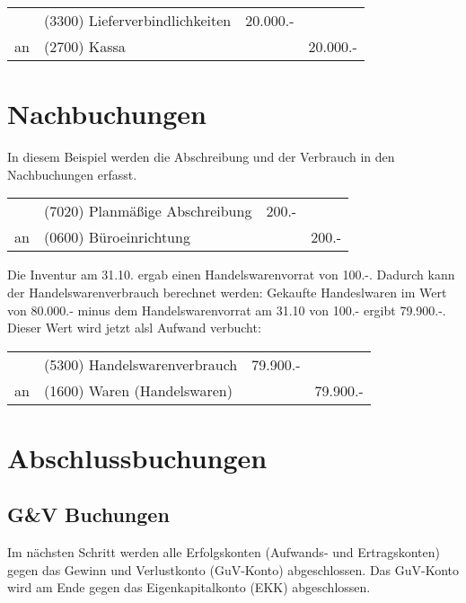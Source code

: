 \documentclass[parskip=half,12pt,a4paper]{scrartcl}
\begin{document}
\begin{center}
\begin{tabularx}{\textwidth}{rXrr}
 \toprule
    & (3300) Lieferverbindlichkeiten & 20.000.- &\\
 an & (2700) Kassa & & 20.000.-\\
\bottomrule
\end{tabularx}
\end{center}

\section{Nachbuchungen}

In diesem Beispiel werden die Abschreibung und der Verbrauch in den Nachbuchungen erfasst.

\begin{center}
\begin{tabularx}{\textwidth}{rXrr}
 \toprule
    & (7020) Planmäßige Abschreibung & 200.- &\\
 an & (0600) Büroeinrichtung & & 200.-\\
\bottomrule
\end{tabularx}
\end{center}

Die Inventur am 31.10. ergab einen Handelswarenvorrat von 100.-. Dadurch kann der Handelswarenverbrauch berechnet werden: Gekaufte Handeslwaren im Wert von 80.000.- minus dem Handelswarenvorrat am 31.10 von 100.- ergibt 79.900.-. Dieser Wert wird jetzt alsl Aufwand verbucht:

\begin{center}
\begin{tabularx}{\textwidth}{rXrr}
 \toprule
    & (5300) Handelswarenverbrauch & 79.900.- &\\
 an & (1600) Waren (Handelswaren) & & 79.900.-\\
\bottomrule
\end{tabularx}
\end{center}

\section{Abschlussbuchungen}
\subsection{G\&V Buchungen}

Im nächsten Schritt werden alle Erfolgskonten (Aufwands- und Ertragskonten) gegen das Gewinn und Verlustkonto (GuV-Konto) abgeschlossen. Das GuV-Konto wird am Ende gegen das Eigenkapitalkonto (EKK) abgeschlossen.
\end{document}
